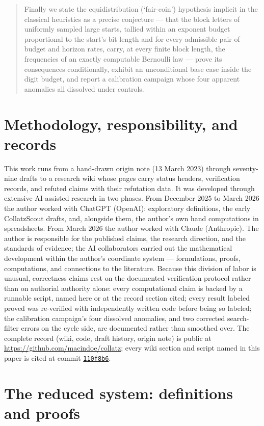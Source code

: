 \documentclass[11pt]{article}
\theoremstyle{remark}
\newcommand{\recordcommit}{\href{https://github.com/macindoe/collatz/tree/110f8b69c065bb1345d865ad2d0431e59146222d}{\texttt{110f8b6}}}
\begin{document}
\begin{quote}
Finally we state the equidistribution (`fair-coin') hypothesis implicit in the classical heuristics as a precise conjecture --- that the block letters of uniformly sampled large starts, tallied within an exponent budget proportional to the start's bit length and for every admissible pair of budget and horizon rates, carry, at every finite block length, the frequencies of an exactly computable Bernoulli law --- prove its consequences conditionally, exhibit an unconditional base case inside the digit budget, and report a calibration campaign whose four apparent anomalies all dissolved under controls.
\end{quote}

\section{Methodology, responsibility, and records}\label{app:method}
This work runs from a hand-drawn origin note (13 March 2023) through seventy-nine drafts to a research wiki whose pages carry status headers, verification records, and refuted claims with their refutation data. It was developed through extensive AI-assisted research in two phases. From December 2025 to March 2026 the author worked with ChatGPT (OpenAI): exploratory definitions, the early CollatzScout drafts, and, alongside them, the author's own hand computations in spreadsheets. From March 2026 the author worked with Claude (Anthropic). The author is responsible for the published claims, the research direction, and the standards of evidence; the AI collaborators carried out the mathematical development within the author's coordinate system --- formulations, proofs, computations, and connections to the literature. Because this division of labor is unusual, correctness claims rest on the documented verification protocol rather than on authorial authority alone: every computational claim is backed by a runnable script, named here or at the record section cited; every result labeled proved was re-verified with independently written code before being so labeled; the calibration campaign's four dissolved anomalies, and two corrected search-filter errors on the cycle side, are documented rather than smoothed over. The complete record (wiki, code, draft history, origin note) is public at \url{https://github.com/macindoe/collatz}; every wiki section and script named in this paper is cited at commit \recordcommit.

\section{The reduced system: definitions and proofs}\label{app:reduced}
\end{document}
